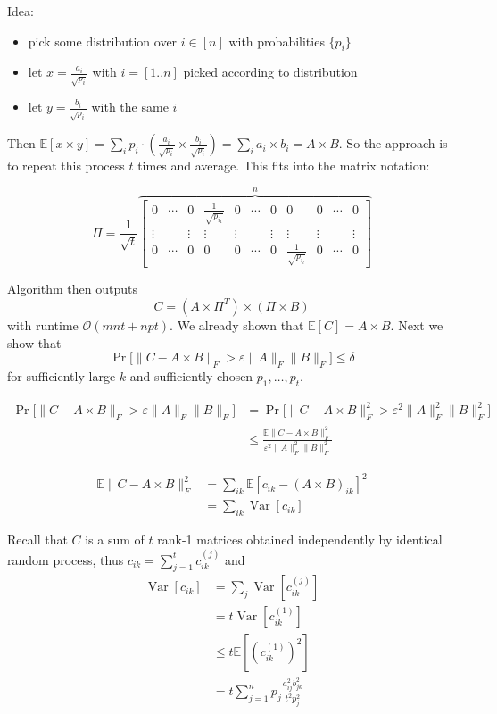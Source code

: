 \documentclass[11pt]{article}
\newcommand{\E}{{\mathbb E}}
\DeclareMathOperator{\var}{Var}
\newcommand{\bigo}{\mathcal{O}}
\begin{document}
Idea: 
\begin{itemize}
\item pick some distribution over $i \in [n]$ with probabilities $\{p_i\}$
\item let $x = \frac{a_i}{\sqrt{p_i}}$ with $i = [1..n]$ picked according to distribution
\item let $y = \frac{b_i}{\sqrt{p_i}}$ with the same $i$
\end{itemize}
 Then $\E[x \times y] = \sum_i p_i \cdot( \frac{a_i}{\sqrt{p_i}} \times \frac{b_i}{\sqrt{p_i}}) = \sum_i a_i \times b_i = A \times B$. So the approach is to repeat this process $t$ times and average. This fits into the matrix notation:
 
 $$\Pi = \frac{1}{\sqrt{t}} 
 \overbrace{
 \begin{bmatrix} 
 0 & \cdots & 0 & \frac{1}{\sqrt{p_{i_1}}} & 0 & \cdots  & 0 & 0 & 0 & \cdots & 0 \\
 \vdots & & \vdots & \vdots & \vdots & & \vdots & \vdots & \vdots & & \vdots \\
 0 & \cdots & 0 & 0 & 0 & \cdots  & 0 &  \frac{1}{\sqrt{p_{i_t}}} & 0 & \cdots & 0
 \end{bmatrix} 
 }^{n}$$
 
 Algorithm then outputs
 $$ C = (A \times \Pi^T) \times (\Pi \times B)$$
 with runtime $\bigo(mnt+npt)$.
 We already shown that $\E[C] = A \times B$. Next we show that
 $$\Pr\Big[\| C - A \times B\|_F > \varepsilon \|A\|_F \|B\|_F\Big] \le \delta$$
 for sufficiently large $k$ and sufficiently chosen $p_1,\ldots,p_t$.
 
\begin{align*}
\Pr\Big[\| C - A \times B\|_F > \varepsilon \|A\|_F \|B\|_F\Big] &= \Pr\Big[\| C - A \times B\|_F^2 > \varepsilon^2 \|A\|_F^2 \|B\|_F^2\Big]\\
&\le \frac{\E \| C - A \times B\|_F^2}{ \varepsilon^2 \|A\|_F^2 \|B\|_F^2 }
\end{align*}

\begin{align*}
\E \| C - A \times B\|_F^2 &= \sum_{ik} \E[c_{ik} - (A \times B)_{ik}]^2\\
&= \sum_{ik} \var[c_{ik}]
\end{align*}


Recall that $C$ is a sum of $t$ rank-1 matrices obtained independently by identical random process, thus
$c_{ik} = \sum_{j=1}^t c_{ik}^{(j)}$ and
\begin{align*}
\var[c_{ik}] &= \sum_{j} \var[c^{(j)}_{ik}]\\
 &= t \var[c^{(1)}_{ik}]\\
 &\le t \E[(c^{(1)}_{ik})^2] \\
 &= t\sum_{j=1}^n p_j \frac{a_{ij}^2 b_{jk}^2}{t^2 p^2_j}
\end{align*}
\end{document}
